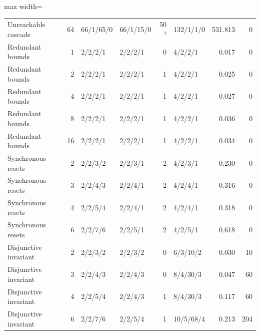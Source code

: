 \begin{table}[t]
\begin{adjustbox}{max width=\textwidth}
\begin{tabular}{@{}p{}r p{}p{}r p{}rr@{}}
Unreachable cascade & 64 & 66/1/65/0 & 66/1/15/0 & 50$^\dagger$ & 132/1/1/0 & 531.813 & 0 \\
Redundant bounds & 1 & 2/2/2/1 & 2/2/2/1 & 0 & 4/2/2/1 & 0.017 & 0 \\
Redundant bounds & 2 & 2/2/2/1 & 2/2/2/1 & 1 & 4/2/2/1 & 0.025 & 0 \\
Redundant bounds & 4 & 2/2/2/1 & 2/2/2/1 & 1 & 4/2/2/1 & 0.027 & 0 \\
Redundant bounds & 8 & 2/2/2/1 & 2/2/2/1 & 1 & 4/2/2/1 & 0.036 & 0 \\
Redundant bounds & 16 & 2/2/2/1 & 2/2/2/1 & 1 & 4/2/2/1 & 0.034 & 0 \\
Synchronous resets & 2 & 2/2/3/2 & 2/2/3/1 & 2 & 4/2/3/1 & 0.230 & 0 \\
Synchronous resets & 3 & 2/2/4/3 & 2/2/4/1 & 2 & 4/2/4/1 & 0.316 & 0 \\
Synchronous resets & 4 & 2/2/5/4 & 2/2/4/1 & 2 & 4/2/4/1 & 0.318 & 0 \\
Synchronous resets & 6 & 2/2/7/6 & 2/2/5/1 & 2 & 4/2/5/1 & 0.618 & 0 \\
Disjunctive invariant & 2 & 2/2/3/2 & 2/2/3/2 & 0 & 6/3/10/2 & 0.030 & 10 \\
Disjunctive invariant & 3 & 2/2/4/3 & 2/2/4/3 & 0 & 8/4/30/3 & 0.047 & 60 \\
Disjunctive invariant & 4 & 2/2/5/4 & 2/2/4/3 & 1 & 8/4/30/3 & 0.117 & 60 \\
Disjunctive invariant & 6 & 2/2/7/6 & 2/2/5/4 & 1 & 10/5/68/4 & 0.213 & 204 \\
\bottomrule
\end{tabular}\end{adjustbox}
\end{table}
